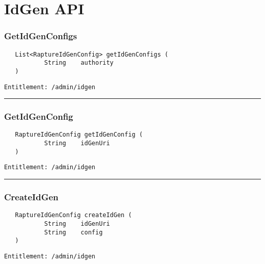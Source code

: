 \chapter{IdGen API}

\subsection{GetIdGenConfigs}
\label{Api:GetIdGenConfigs}
\begin{verbatim}
   List<RaptureIdGenConfig> getIdGenConfigs (
           String    authority
   )
\end{verbatim}
\begin{Verbatim}[fontsize=\small, formatcom=\color{Maroon}]
  Entitlement: /admin/idgen
\end{Verbatim}



\rule{12cm}{2pt}
\subsection{GetIdGenConfig}
\label{Api:GetIdGenConfig}
\begin{verbatim}
   RaptureIdGenConfig getIdGenConfig (
           String    idGenUri
   )
\end{verbatim}
\begin{Verbatim}[fontsize=\small, formatcom=\color{Maroon}]
  Entitlement: /admin/idgen
\end{Verbatim}



\rule{12cm}{2pt}
\subsection{CreateIdGen}
\label{Api:CreateIdGen}
\begin{verbatim}
   RaptureIdGenConfig createIdGen (
           String    idGenUri
           String    config
   )
\end{verbatim}
\begin{Verbatim}[fontsize=\small, formatcom=\color{Maroon}]
  Entitlement: /admin/idgen
\end{Verbatim}




